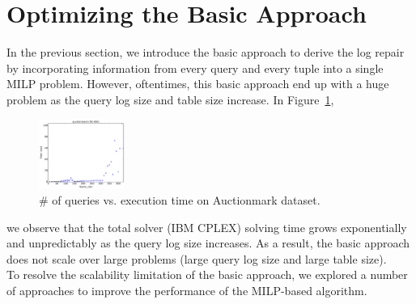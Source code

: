 \section{Optimizing the Basic Approach}
\label{sec:opt}

In the previous section, we introduce the basic approach to derive
the log repair by incorporating information from every query
and every tuple into a single MILP problem. However, oftentimes, 
this basic approach end up with 
a huge problem as the query log size and table size increase. 
In Figure~\ref{fig:querysize_vs_time}, 
\begin{figure}
    \centering
        \includegraphics[width=0.25\textwidth]{figures/auctionmark_qsize_time}
    \caption{\# of queries vs. execution time on Auctionmark dataset. }
    \label{fig:querysize_vs_time}
\end{figure}
we observe that the total solver (IBM CPLEX) solving time 
grows exponentially and 
unpredictably as the query 
log size increases. As a result, the basic approach does not scale over 
large problems (large query log size and large table size).\\
To resolve the scalability limitation of the basic approach, 
we explored a number of approaches to improve the performance of the 
MILP-based algorithm.

